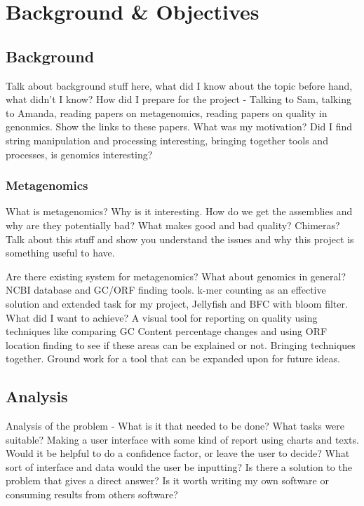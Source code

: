 \chapter{Background \& Objectives}




\section{Background}
Talk about background stuff here, what did I know about the topic before hand, what didn't I know? How did I prepare for the project - Talking to Sam, talking to Amanda, reading papers on metagenomics, reading papers on quality in genonmics. Show the links to these papers. What was my motivation? Did I find string manipulation and processing interesting, bringing together tools and processes, is genomics interesting? 

\subsection{Metagenomics}
What is metagenomics? Why is it interesting. How do we get the assemblies and why are they potentially bad? What makes good and bad quality? Chimeras? Talk about this stuff and show you understand the issues and why this project is something useful to have. 

Are there existing system for metagenomics? What about genomics in general? NCBI database and GC/ORF finding tools. k-mer counting as an effective solution and extended task for my project, Jellyfish and BFC with bloom filter. What did I want to achieve? A visual tool for reporting on quality using techniques like comparing GC Content percentage changes and using ORF location finding to see if these areas can be explained or not. Bringing techniques together. Ground work for a tool that can be expanded upon for future ideas.


\section{Analysis}
Analysis of the problem - What is it that needed to be done? What tasks were suitable? Making a user interface with some kind of report using charts and texts. Would it be helpful to do a confidence factor, or leave the user to decide? What sort of interface and data would the user be inputting? Is there a solution to the problem that gives a direct answer? Is it worth writing my own software or consuming results from others software?

